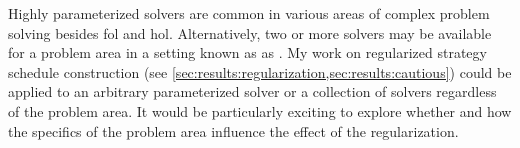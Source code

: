 Highly parameterized solvers are common in various areas of complex problem solving besides \gls{fol} and \gls{hol}.
Alternatively, two or more solvers may be available for a problem area in a setting known as \gls{as} \cite{DBLP:journals/ai/BischlKKLMFHHLT16}.
My work on regularized strategy schedule construction (see \cref{sec:results:regularization,sec:results:cautious}) could be applied to an arbitrary parameterized solver or a collection of solvers regardless of the problem area.
It would be particularly exciting to explore whether and how
the specifics of the problem area
influence the effect of the regularization.

